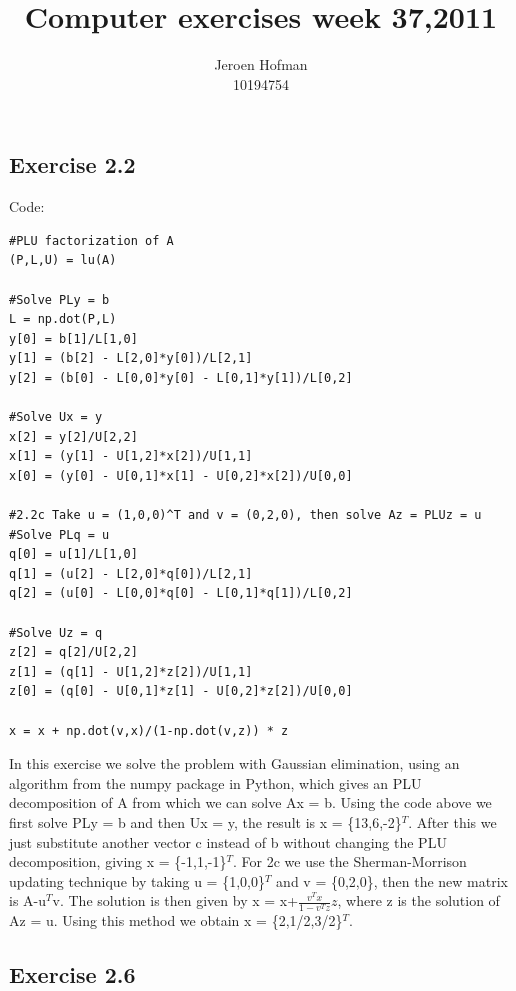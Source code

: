 \documentclass[10pt,a4paper]{article}
\begin{document}
\lstset{language=Python,breaklines=true}

\author{Jeroen Hofman\\
		10194754\\
		}
\title{Computer exercises week 37,2011\\
		}
\date{}
\maketitle

\subsection*{Exercise 2.2}

Code:
\begin{lstlisting}
#PLU factorization of A
(P,L,U) = lu(A)

#Solve PLy = b
L = np.dot(P,L)
y[0] = b[1]/L[1,0]
y[1] = (b[2] - L[2,0]*y[0])/L[2,1]
y[2] = (b[0] - L[0,0]*y[0] - L[0,1]*y[1])/L[0,2]

#Solve Ux = y
x[2] = y[2]/U[2,2]
x[1] = (y[1] - U[1,2]*x[2])/U[1,1]
x[0] = (y[0] - U[0,1]*x[1] - U[0,2]*x[2])/U[0,0]

#2.2c Take u = (1,0,0)^T and v = (0,2,0), then solve Az = PLUz = u
#Solve PLq = u
q[0] = u[1]/L[1,0]
q[1] = (u[2] - L[2,0]*q[0])/L[2,1]
q[2] = (u[0] - L[0,0]*q[0] - L[0,1]*q[1])/L[0,2]

#Solve Uz = q
z[2] = q[2]/U[2,2]
z[1] = (q[1] - U[1,2]*z[2])/U[1,1]
z[0] = (q[0] - U[0,1]*z[1] - U[0,2]*z[2])/U[0,0]

x = x + np.dot(v,x)/(1-np.dot(v,z)) * z
\end{lstlisting}

\noindent In this exercise we solve the problem with Gaussian elimination, using an algorithm from the numpy package in Python, which gives an PLU decomposition of A from which we can solve Ax = b. Using the code above we first solve PLy = b and then Ux = y, the result is x = \{13,6,-2\}$^T$. After this we just substitute another vector c instead of b without changing the PLU decomposition, giving x = \{-1,1,-1\}$^T$. For 2c we use the Sherman-Morrison updating technique by taking u = \{1,0,0\}$^T$ and v = \{0,2,0\}, then the new matrix is A-u$^{T}$v. The solution is then given by x = x+$\frac{v^T x}{1-v^T z} z$, where z is the solution of Az = u. Using this method we obtain x = \{2,1/2,3/2\}$^T$.

\subsection*{Exercise 2.6}
\end{document}
